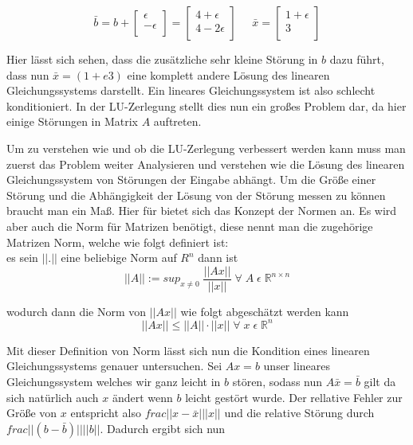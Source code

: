 \documentclass[course=erap]{aspdoc}
\begin{document}
\begin{equation}
\label{absBeis2}
\bar{b} = b + 
 \begin{bmatrix}
 \epsilon \\
 -\epsilon\\
 \end{bmatrix}
 = \begin{bmatrix}
 4 + \epsilon\\
 4- 2\epsilon\\
 \end{bmatrix}
  \;\;\;\;\;
  \bar{x} = 
  \begin{bmatrix}
 1 + \epsilon \\
 3\\
\end{bmatrix}
\end{equation}

Hier lässt sich sehen, dass die zusätzliche sehr kleine Störung in $b$ dazu führt, 
dass nun $\bar{x} = ( 1+e 3)$ eine komplett andere Lösung des linearen Gleichungssystems darstellt.
Ein lineares Gleichungssystem ist also schlecht konditioniert. In der LU-Zerlegung stellt dies nun ein großes 
Problem dar, da hier einige Störungen in Matrix $A$ auftreten.

Um zu verstehen wie und ob die LU-Zerlegung verbessert werden kann muss man 
zuerst das Problem weiter Analysieren und verstehen wie die Lösung des linearen 
Gleichungssystem von Störungen der Eingabe abhängt. 
Um die Größe einer Störung und die Abhängigkeit der Lösung von der Störung messen zu 
können braucht man ein Maß. Hier für bietet sich das Konzept der Normen an. Es wird aber 
auch die Norm für Matrizen benötigt, diese nennt man die zugehörige Matrizen Norm, 
welche wie folgt definiert ist: \\

es sein $||.||$ eine beliebige Norm auf $R^n$ dann ist  
\begin{equation}
\label{norm}
||A|| := sup_{x\neq 0}\;\frac{||Ax||}{||x||}\; \forall\; A \;\epsilon \;\mathbb{R}^{n \times n}
\end{equation}

wodurch dann die Norm von $||Ax||$ wie folgt abgeschätzt werden kann
 \begin{equation}
\label{norm}
||Ax|| \leq ||A|| \cdot ||x||\;  \forall\; x \;\epsilon \;\mathbb{R}^n 
\end{equation}

Mit dieser Definition von Norm lässt sich nun die Kondition eines linearen 
Gleichungssystems genauer untersuchen. Sei $Ax=b$ unser lineares Gleichungssystem 
welches wir ganz leicht in $b$ stören, sodass nun $A \bar{x}=\bar{b}$ gilt da sich natürlich auch $x $
ändert wenn $b$ leicht gestört wurde. 
Der rellative Fehler zur Größe von $x$ entspricht also 
 $frac{||x-\bar{x}|}{||x||}$ und die relative Störung durch 
$frac{||(b-\bar{b})||}{||b||}$. Dadurch ergibt sich nun 
\end{document}
